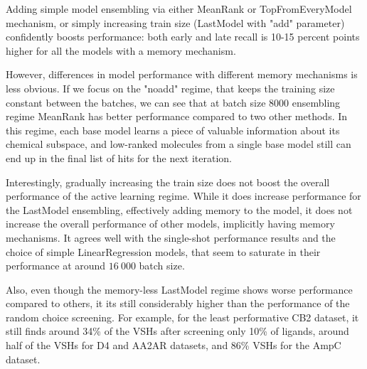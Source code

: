 Adding simple model ensembling via either MeanRank or TopFromEveryModel mechanism, or simply increasing train size (LastModel with "add" parameter) confidently boosts performance: both early and late recall is 10-15 percent points higher for all the models with a memory mechanism.

However, differences in model performance with different memory mechanisms is less obvious. If we focus on the "noadd" regime, that keeps the training size constant between the batches, we can see that at batch size 8000  ensembling regime MeanRank has better performance compared to two other methods. In this regime, each base model learns a piece of valuable information about its chemical subspace, and low-ranked molecules from a single base model still can end up in the final list of hits for the next iteration.

Interestingly, gradually increasing the train size does not boost the overall performance of the active learning regime. While it does increase performance for the LastModel ensembling, effectively adding memory to the model, it does not increase the overall performance of other models, implicitly having memory mechanisms. It agrees well with the single-shot performance results and the choice of simple LinearRegression models, that seem to saturate in their performance at around $16\ 000$ batch size.

Also, even though the memory-less LastModel regime shows worse performance compared to others, it its still considerably higher than the performance of the random choice screening. For example, for the least performative CB2 dataset, it still finds around 34\% of the VSHs after screening only 10\% of ligands, around half of the VSHs for D4 and AA2AR datasets, and 86\% VSHs for the AmpC dataset.
